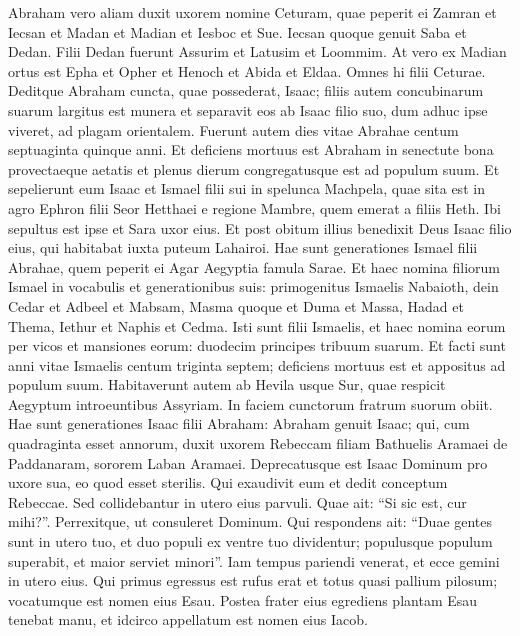 \begin{biblechapter}  
\verse Abraham vero aliam duxit uxorem nomine Ceturam, 
\verse quae peperit ei Zamran et Iecsan et Madan et Madian et Iesboc et Sue.  
\verse Iecsan quoque genuit Saba et Dedan. Filii Dedan fuerunt Assurim et Latusim et Loommim. 
\verse At vero ex Madian ortus est Epha et Opher et Henoch et Abida et Eldaa. Omnes hi filii Ceturae. 
\verse Deditque Abraham cuncta, quae possederat, Isaac; 
\verse filiis autem concubinarum suarum largitus est munera et separavit eos ab Isaac filio suo, dum adhuc ipse viveret, ad plagam orientalem. 
\verse Fuerunt autem dies vitae Abrahae centum septuaginta quinque anni. 
\verse Et deficiens mortuus est Abraham in senectute bona provectaeque aetatis et plenus dierum congregatusque est ad populum suum. 
\verse Et sepelierunt eum Isaac et Ismael filii sui in spelunca Machpela, quae sita est in agro Ephron filii Seor Hetthaei e regione Mambre, 
\verse quem emerat a filiis Heth. Ibi sepultus est ipse et Sara uxor eius. 
\verse Et post obitum illius benedixit Deus Isaac filio eius, qui habitabat iuxta puteum Lahairoi. 
\verse Hae sunt generationes Ismael filii Abrahae, quem peperit ei Agar Aegyptia famula Sarae. 
\verse Et haec nomina filiorum Ismael in vocabulis et generationibus suis: primogenitus Ismaelis Nabaioth, dein Cedar et Adbeel et Mabsam, 
\verse Masma quoque et Duma et Massa, 
\verse Hadad et Thema, Iethur et Naphis et Cedma. 
\verse Isti sunt filii Ismaelis, et haec nomina eorum per vicos et mansiones eorum: duodecim principes tribuum suarum. 
\verse Et facti sunt anni vitae Ismaelis centum triginta septem; deficiens mortuus est et appositus ad populum suum. 
\verse Habitaverunt autem ab Hevila usque Sur, quae respicit Aegyptum introeuntibus Assyriam. In faciem cunctorum fratrum suorum obiit. 
\verse Hae sunt generationes Isaac filii Abraham: Abraham genuit Isaac; 
\verse qui, cum quadraginta esset annorum, duxit uxorem Rebeccam filiam Bathuelis Aramaei de Paddanaram, sororem Laban Aramaei. 
\verse Deprecatusque est Isaac Dominum pro uxore sua, eo quod esset sterilis. Qui exaudivit eum et dedit conceptum Rebeccae. 
\verse Sed collidebantur in utero eius parvuli. Quae ait: “Si sic est, cur mihi?”. Perrexitque, ut consuleret Dominum. 
\verse Qui respondens ait: “Duae gentes sunt in utero tuo, et duo populi ex ventre tuo dividentur; populusque populum superabit, et maior serviet minori”. 
\verse Iam tempus pariendi venerat, et ecce gemini in utero eius. 
\verse Qui primus egressus est rufus erat et totus quasi pallium pilosum; vocatumque est nomen eius Esau. Postea frater eius egrediens plantam Esau tenebat manu, et idcirco appellatum est nomen eius Iacob. 

\end{biblechapter}

